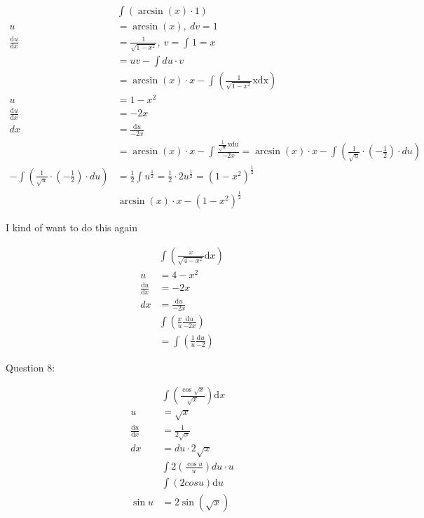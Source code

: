 \documentclass[12pt]{article}
\theoremstyle{plain}
\theoremstyle{remark}
\theoremstyle{definition}
\begin{document}
\begin{align*}
&\int\left( \arcsin(x) \cdot 1 \right) \\
u &= \arcsin(x),\ dv = 1 \\
\frac{\text{d}u}{\text{d}x} &= \frac{1}{\sqrt{1 - x^{2}}},\ v = \int_{}^{}1 = x \\
&= uv - \int du \cdot v \\
&= \arcsin(x) \cdot x - \int\left( \frac{1}{\sqrt{1 - x^{2}}}\text{xdx} \right) \\
u &= 1 - x^{2} \\
\frac{\text{d}u}{\text{d}x} &= - 2x \\
dx &= \frac{\text{d}u}{- 2x} \\
&= \arcsin(x) \cdot x - \int_{}^{}\frac{\frac{1}{\sqrt{u}}\text{xdu}}{- 2x} = \arcsin(x) \cdot x - \int\left( \frac{1}{\sqrt{u}} \cdot \left( - \frac{1}{2} \right) \cdot du \right) \\
- \int\left( \frac{1}{\sqrt{u}} \cdot \left( - \frac{1}{2} \right) \cdot du \right) &= \frac{1}{2}\int u^{\frac{1}{2}} = \frac{1}{2} \cdot 2u^{\frac{1}{2}} = \left( 1 - x^{2} \right)^{\frac{1}{2}} \\
&\arcsin(x) \cdot x - \left( 1 - x^{2} \right)^{\frac{1}{2}}
\end{align*}


I kind of want to do this again

\begin{align*}
&\int\left( \frac{x}{\sqrt{4 - x^{2}}}\text{d}x \right) \\
u &= 4 - x^{2} \\
\frac{\text{d}u}{\text{d}x} &= - 2x \\
dx &= \frac{\text{d}u}{- 2x} \\
&\int\left( \frac{x}{u}\frac{\text{d}u}{- 2x} \right) \\
&= \int\left( \frac{1}{u}\frac{\text{d}u}{- 2} \right)
\end{align*}


Question 8:

\begin{align*}
&\int\left( \frac{\cos\sqrt{x}}{\sqrt{x}} \right)\text{d}x \\
u &= \sqrt{x} \\
\frac{\text{d}u}{\text{d}x} &= \frac{1}{2\sqrt{x}} \\
dx &= du \cdot 2\sqrt{x} \\
&\int 2\left( \frac{\cos u}{u} \right)du \cdot u \\
&\int\left( {2cos}u \right)\text{d}u \\
\sin u &= 2\sin\left( \sqrt{x} \right)
\end{align*}
\end{document}
